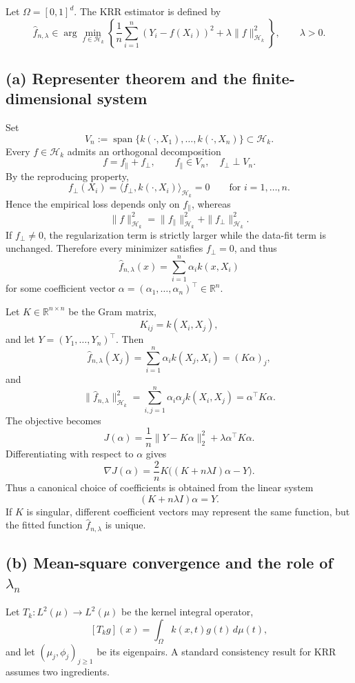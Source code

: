 \documentclass[11pt,en]{elegantpaper}
\newcommand{\R}{\mathbb{R}}
\newcommand{\Hs}{\mathcal{H}_k}
\DeclareMathOperator{\Span}{span}
\begin{document}
Let \(\Omega=[0,1]^d\). The KRR estimator is defined by
\[
\hat f_{n,\lambda}\in \arg\min_{f\in \Hs}
\left\{
\frac{1}{n}\sum_{i=1}^n (Y_i-f(X_i))^2+\lambda \|f\|_{\Hs}^2
\right\},
\qquad \lambda>0.
\]

\subsection*{(a) Representer theorem and the finite-dimensional system}

Set
\[
V_n:=\Span\{k(\cdot,X_1),\dots,k(\cdot,X_n)\}\subset \Hs.
\]
Every \(f\in \Hs\) admits an orthogonal decomposition
\[
f=f_\parallel+f_\perp, \qquad f_\parallel\in V_n,\quad f_\perp\perp V_n.
\]
By the reproducing property,
\[
f_\perp(X_i)=\langle f_\perp,k(\cdot,X_i)\rangle_{\Hs}=0
\qquad \text{for } i=1,\dots,n.
\]
Hence the empirical loss depends only on \(f_\parallel\), whereas
\[
\|f\|_{\Hs}^2=\|f_\parallel\|_{\Hs}^2+\|f_\perp\|_{\Hs}^2.
\]
If \(f_\perp\neq 0\), the regularization term is strictly larger while the data-fit term is
unchanged. Therefore every minimizer satisfies \(f_\perp=0\), and thus
\[
\hat f_{n,\lambda}(x)=\sum_{i=1}^n \alpha_i k(x,X_i)
\]
for some coefficient vector \(\alpha=(\alpha_1,\dots,\alpha_n)^\top\in\R^n\).

Let \(K\in \R^{n\times n}\) be the Gram matrix,
\[
K_{ij}=k(X_i,X_j),
\]
and let \(Y=(Y_1,\dots,Y_n)^\top\). Then
\[
\hat f_{n,\lambda}(X_j)=\sum_{i=1}^n \alpha_i k(X_j,X_i)=(K\alpha)_j,
\]
and
\[
\|\hat f_{n,\lambda}\|_{\Hs}^2
=\sum_{i,j=1}^n \alpha_i\alpha_j k(X_i,X_j)
=\alpha^\top K\alpha.
\]
The objective becomes
\[
J(\alpha)=\frac{1}{n}\|Y-K\alpha\|_2^2+\lambda \alpha^\top K\alpha.
\]
Differentiating with respect to \(\alpha\) gives
\[
\nabla J(\alpha)=\frac{2}{n}K\bigl((K+n\lambda I)\alpha-Y\bigr).
\]
Thus a canonical choice of coefficients is obtained from the linear system
\[
(K+n\lambda I)\alpha=Y.
\]
If \(K\) is singular, different coefficient vectors may represent the same function, but
the fitted function \(\hat f_{n,\lambda}\) is unique.

\subsection*{(b) Mean-square convergence and the role of \(\lambda_n\)}

Let \(T_k:L^2(\mu)\to L^2(\mu)\) be the kernel integral operator,
\[
[T_k g](x)=\int_\Omega k(x,t)g(t)\,d\mu(t),
\]
and let \((\mu_j,\phi_j)_{j\ge 1}\) be its eigenpairs. A standard consistency result for
KRR assumes two ingredients.
\end{document}
